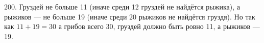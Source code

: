 200. Груздей не больше 11 (иначе среди 12 груздей не найдётся рыжика), а рыжиков --- не больше 19 (иначе среди 20 рыжиков не найдётся груздя). Но так как $11+19=30$ а грибов всего 30, груздей должно быть ровно 11, а рыжиков --- 19.\\
